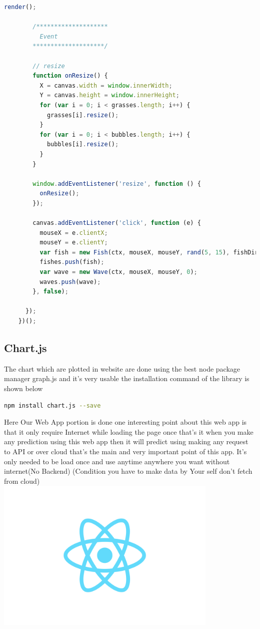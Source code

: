 \begin{lstlisting}[language=javascript, caption={Background animation}]
        render();

        /********************
          Event
        ********************/

        // resize
        function onResize() {
          X = canvas.width = window.innerWidth;
          Y = canvas.height = window.innerHeight;
          for (var i = 0; i < grasses.length; i++) {
            grasses[i].resize();
          }
          for (var i = 0; i < bubbles.length; i++) {
            bubbles[i].resize();
          }
        }

        window.addEventListener('resize', function () {
          onResize();
        });

        canvas.addEventListener('click', function (e) {
          mouseX = e.clientX;
          mouseY = e.clientY;
          var fish = new Fish(ctx, mouseX, mouseY, rand(5, 15), fishDir[rand(0, 1)], fishColors[rand(0, fishColors.length - 1)]);
          fishes.push(fish);
          var wave = new Wave(ctx, mouseX, mouseY, 0);
          waves.push(wave);
        }, false);

      });
    })();
\end{lstlisting}

\subsection{Chart.js}
The chart which are plotted in website are done using the best node package manager graph.js and it's very usable the installation command of the library is shown below


\begin{lstlisting}[language=bash, caption={Installation command graph.js}]
npm install chart.js --save
\end{lstlisting}

Here Our Web App portion is done one interesting point about this web app is that it only require Internet while loading the page once that's it when you make any prediction using this web app then it will predict using making any request to API or over cloud that's the main and very important point of this app. It's only needed to be load once and use anytime anywhere you want without internet(No Backend) (Condition you have to make data by Your self don't fetch from cloud)\\

\includegraphics[width=0.8\textwidth]{images/react.png}\\

